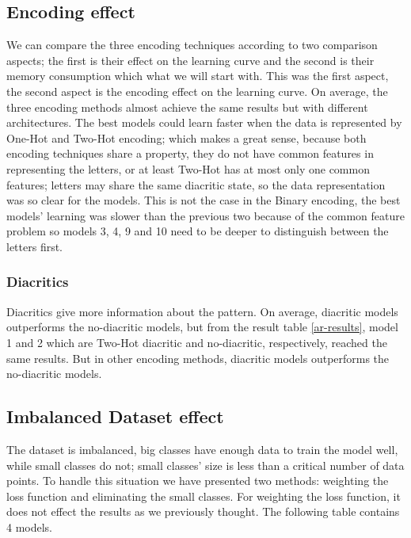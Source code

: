 \subsection*{Encoding effect}
We can compare the three encoding techniques according to two comparison aspects; the
first is their effect on the learning curve and the second is their  memory
consumption  which what we will start with. 
This was the first aspect, the second aspect is the encoding effect on the
learning curve. On average, the three encoding methods almost achieve the same
results but with different architectures. The
best models could learn faster when the data is represented by One-Hot and
Two-Hot encoding; which makes a great sense, because both encoding techniques
share a property, they do not have common features in representing the letters,
or at least Two-Hot has at most only one common features; letters may share the
same diacritic state, so the data representation was so clear for the models.
This is not the case in the Binary encoding, the
best models' learning was slower than the previous two  because of the common
feature problem  so models 3, 4, 9 and 10 
need to be deeper to %
distinguish between the letters first. 

 





\subsubsection{Diacritics}
 Diacritics give more information about the pattern. On average, diacritic models
outperforms the no-diacritic models, but from the result table \ref{ar-results},
model 1 and 2 which are Two-Hot diacritic and no-diacritic, respectively, reached
the same results. But in other encoding methods, diacritic models outperforms the
no-diacritic models.







  
\subsection*{Imbalanced Dataset effect}
The dataset is imbalanced, big classes have enough
data to train the model well, while small classes do not; small classes' size is
less than a critical number of data points. To handle this situation we have presented two
methods: weighting the loss function and eliminating the small classes. For
weighting the loss function, it does not effect the results as we previously
thought. The following table contains 4 models.

